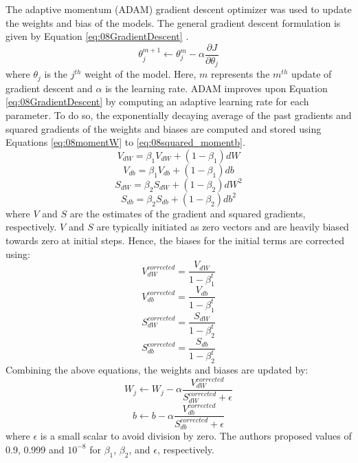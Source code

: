 The adaptive momentum (ADAM) gradient descent optimizer was used to update the weights and bias of the models.  The general gradient descent formulation is given by Equation \ref{eq:08GradientDescent} \cite{ADAM}.  
\begin{equation}
    \theta_j^{m+1} \leftarrow \theta_j^{m} - \alpha \frac{\partial J}{\partial \theta_j}
    \label{eq:08GradientDescent}
\end{equation}
where $\theta_j$ is the $j^{th}$ weight of the model.  Here, $m$ represents the $m^{th}$ update of gradient descent and $\alpha$ is the learning rate.  ADAM improves upon Equation \ref{eq:08GradientDescent} by computing an adaptive learning rate for each parameter. To do so, the exponentially decaying average of the past gradients and squared gradients of the weights and biases are computed and stored using Equations \ref{eq:08momentW} to \ref{eq:08squared_momentb}.
\begin{equation}
    V_{dW} = \beta_1 V_{dW} + (1 - \beta_1)dW
    \label{eq:08momentW}
\end{equation}
\begin{equation}
    V_{db} = \beta_1 V_{db} + (1 - \beta_1)db
    \label{eq:08momentb}
\end{equation}
\begin{equation}
    S_{dW} = \beta_2 S_{dW} + (1 - \beta_2)dW^2
    \label{eq:08squared_momentW}
\end{equation}
\begin{equation}
    S_{db} = \beta_2 S_{db} + (1 - \beta_2)db^2
    \label{eq:08squared_momentb}
\end{equation}
where $V$ and $S$ are the estimates of the gradient and squared gradients, respectively.  $V$ and $S$ are typically initiated as zero vectors and are heavily biased towards zero at initial steps.  Hence, the biases for the initial terms are corrected using:
\begin{equation}
    V_{dW}^{corrected} = \frac{V_{dW}}{1 - \beta_1^t}
\end{equation}
\begin{equation}
    V_{db}^{corrected} = \frac{V_{db}}{1 - \beta_1^t}
\end{equation}
\begin{equation}
    S_{dW}^{corrected} = \frac{S_{dW}}{1 - \beta_2^t}
\end{equation}
\begin{equation}
    S_{db}^{corrected} = \frac{S_{db}}{1 - \beta_2^t}
\end{equation}
Combining the above equations, the weights and biases are updated by:
\begin{equation}
    W_j \leftarrow W_j - \alpha \frac{V_{dW}^{corrected}}{S_{dW}^{corrected} + \epsilon}
\end{equation}
\begin{equation}
    b \leftarrow b - \alpha \frac{V_{db}^{corrected}}{S_{db}^{corrected} + \epsilon}
\end{equation}
where $\epsilon$ is a small scalar to avoid division by zero. The authors proposed values of 0.9, 0.999 and $10^{-8}$ for $\beta_1$, $\beta_2$, and $\epsilon$, respectively.

